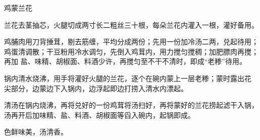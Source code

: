 %
%
%
%
%
%
%
\begin{recipe}{鸡蒙兰花}

\ingredients


\preparation

\step 兰花去茎抽芯，火腿切成两寸长二粗丝三十根，每朵兰花内灌入一根，灌好备用。

\step 鸡脯肉用刀背捶茸，剔去筋缠，平均分成两份；先用一份加冷汤二两，兑起待用；
鸡蛋清调散；干豆粉用冷水调匀，先倒入鸡茸内，用力搅匀搅稠；加肥膘肉再搅；再加
盐、味精、胡椒面、料酒少许，再搅匀至不干不清时，即成“老糁”待用。

\step 锅内清水烧沸，用手将灌好火腿的兰花，逐个在碗内蒙上一层老糁；蒙时露出花
尖部分，边蒙边下入锅内，边浮起即边打捞入清水内漂起。

\step 清汤在锅内烧沸，再将兑好的一份鸡茸将汤扫好，再将蒙好的兰花捞起滤干入锅，
汤再开后加味精、盐、料酒、胡椒面等舀入碗内，起锅即成。

\features

色鲜味美，汤清香。

\end{recipe}

